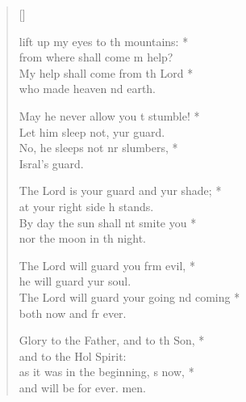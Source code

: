 \settowidth{\versewidth}{The Lord will guard your going and coming * *}
\begin{verse}[\versewidth]
  \begin{patverse}
 lift up my eyes to th mountains: *\Med\\
from where shall come m help?\\
My help shall come from th Lord *\Med\\
who made heaven nd earth.

May he never allow you t stumble! *\Med\\
Let him sleep not, yur guard.\\
No, he sleeps not nr slumbers, *\Med\\
Isral’s guard.

The Lord is your guard and yur shade; *\Med\\
at your right side h stands.\\
By day the sun shall nt smite you *\Med\\
nor the moon in th night.

The Lord will guard you frm evil, *\Med\\
he will guard yur soul.\\
The Lord will guard your going nd coming *\Med\\
both now and fr ever.

Glory to the Father, and to th Son, *\Med\\
and to the Hol Spirit:\\
as it was in the beginning, \pointup{\i}s now, *\Med\\
and will be for ever. men.
  \end{patverse}
\end{verse}
